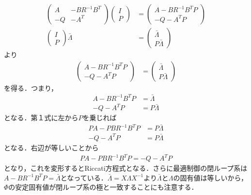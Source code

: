 \begin{align}
	\left(\begin{array}{cc}
	       A  & - B R^{-1} B^T \\
	       -Q & - A^T
	\end{array}\right)
		 \left(\begin{array}{c}
		      I \\
		      P
		\end{array}\right)
	&= 
	\left(\begin{array}{c}
	       A  - B R^{-1} B^T P \\
	       -Q - A^T P
	\end{array}\right)
\nonumber \\
		 \left(\begin{array}{cccc}
		      I \\
		      P
		\end{array}\right)
		\bar{\Lambda}
		& = 
		 \left(\begin{array}{cccc}
		      \bar{\Lambda} \\
		      P \bar{\Lambda}
		\end{array}\right)
\nonumber 
\end{align}
より
\begin{align}
	\left(\begin{array}{c}
	       A  - B R^{-1} B^T P \\
	       -Q - A^T P
	\end{array}\right)
		& = 
		 \left(\begin{array}{cccc}
		      \bar{\Lambda} \\
		      P \bar{\Lambda}
		\end{array}\right)
\nonumber 
\end{align}
を得る．つまり，
\begin{align}
	       A  - B R^{-1} B^T P & = \bar{\Lambda} 
\nonumber \\
	       -Q - A^T P & = P \bar{\Lambda}
\nonumber 
\end{align}
となる．第１式に左から$P$を乗じれば
\begin{align}
	       P A  - P B R^{-1} B^T P & = P \bar{\Lambda} 
\nonumber \\
	       -Q - A^T P & = P \bar{\Lambda}
\nonumber
\end{align}
となる．右辺が等しいことから
\begin{align}
	       P A  - P B R^{-1} B^T P = -Q - A^T P
\nonumber
\end{align}
となり，これを変形するとRiccati方程式となる．さらに最適制御の閉ループ系は$A  - B R^{-1} B^T P = \bar{\Lambda}$となっている．$\bar{\Lambda} = X \Lambda X^{-1}$より$\bar{\Lambda}$と$\Lambda$の固有値は等しいから，$\Phi$の安定固有値が閉ループ系の極と一致することにも注意する．\\

